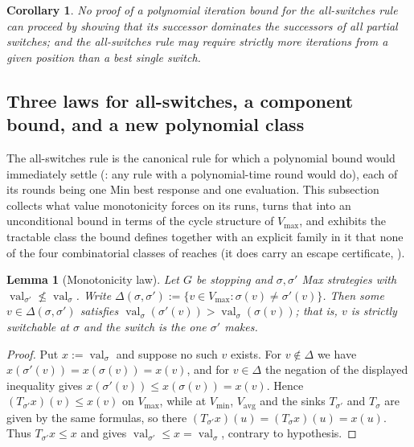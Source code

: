 \documentclass[11pt]{article}
\theoremstyle{plain}
\newtheorem{lemma}[theorem]{Lemma}
\newtheorem{corollary}[theorem]{Corollary}
\theoremstyle{definition}
\DeclareMathOperator{\val}{val}
\newcommand{\Vmax}{V_{\max}}
\newcommand{\Vmin}{V_{\min}}
\newcommand{\Vavg}{V_{\mathrm{avg}}}
\begin{document}
\begin{corollary}
No proof of a polynomial iteration bound for the all-switches rule can
proceed by showing that its successor dominates the successors of all
partial switches; and the all-switches rule may require strictly more
iterations from a given position than a best single switch.
\end{corollary}


\subsection{Three laws for all-switches, a component bound, and a new
polynomial class}\label{sec:allsw-laws}

The all-switches rule is the canonical rule for which a polynomial bound
would immediately settle  (: any
rule with a polynomial-time round would do), each of its rounds being one
Min best response and one evaluation. This subsection collects what value
monotonicity forces on its runs, turns that into an unconditional bound
in terms of the cycle structure of $\Vmax$, and exhibits the tractable
class the bound defines together with an explicit family in it that none
of the four combinatorial classes of  reaches (it does
carry an escape certificate, ).

\begin{lemma}[Monotonicity law]\label{lem:monotone-law}
Let $G$ be stopping and $\sigma,\sigma'$ Max strategies with
$\val_{\sigma'}\not\le\val_\sigma$. Write
$\Delta(\sigma,\sigma'):=\{v\in\Vmax:\sigma(v)\ne\sigma'(v)\}$. Then some
$v\in\Delta(\sigma,\sigma')$ satisfies
$\val_\sigma(\sigma'(v))>\val_\sigma(\sigma(v))$; that is, $v$ is
strictly switchable at $\sigma$ and the switch is the one $\sigma'$ makes.
\end{lemma}

\begin{proof}
Put $x:=\val_\sigma$ and suppose no such $v$ exists. For $v\notin\Delta$
we have $x(\sigma'(v))=x(\sigma(v))=x(v)$, and for $v\in\Delta$ the
negation of the displayed inequality gives $x(\sigma'(v))\le
x(\sigma(v))=x(v)$. Hence $(T_{\sigma'}x)(v)\le x(v)$ on $\Vmax$, while
at $\Vmin$, $\Vavg$ and the sinks $T_{\sigma'}$ and $T_\sigma$ are given
by the same formulas, so there $(T_{\sigma'}x)(u)=(T_\sigma x)(u)=x(u)$.
Thus $T_{\sigma'}x\le x$ and  gives
$\val_{\sigma'}\le x=\val_\sigma$, contrary to hypothesis.
\end{proof}
\end{document}
